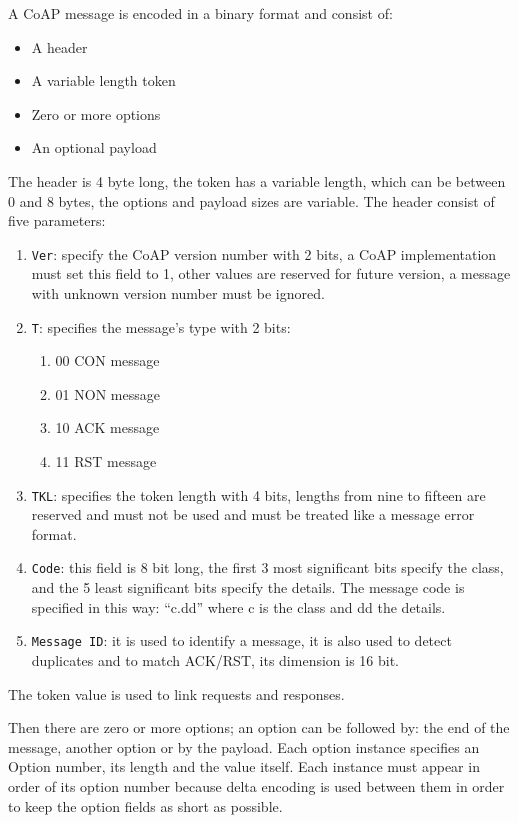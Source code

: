 	A CoAP message is encoded in a binary format and consist of:\newline
	\begin{itemize}
		\item A header
		\item A variable length token
		\item Zero or more options
		\item An optional payload
	\end{itemize}
	The header is 4 byte long, the token has a variable length, which can be between 0 and 8 bytes, the options and payload sizes are variable.\newline
	The header consist of five parameters:\newline
	\begin{enumerate}
		\item \texttt{Ver}: specify the CoAP version number with 2 bits, a CoAP implementation must set this field to 1, other values are reserved for future version, a message with unknown version number must be ignored.
		\item \texttt{T}: specifies the message's type with 2 bits:
		\begin{enumerate}
			\item 00 CON message
			\item 01 NON message
			\item 10 ACK message
			\item 11 RST message
		\end{enumerate}
		\item \texttt{TKL}: specifies the token length with 4 bits, lengths from nine to fifteen are reserved and must not be used and must be treated like a message error format.
		\item \texttt{Code}: this field is 8 bit long, the first 3 most significant bits specify the class, and the 5 least significant bits specify the details.
		The message code is specified in this way: “c.dd” where c is the class and dd the details.
		\item \texttt{Message ID}: it is used to identify a message, it is also used to detect duplicates and to match ACK/RST, its dimension is 16 bit.
	\end{enumerate}
	
	The token value is used to link requests and responses.\newline

	Then there are zero or more options; an option can be followed by: the end of the message, another option or by the payload.\newline
	Each option instance specifies an Option number, its length and the value itself.\newline
	Each instance must appear in order of its option number because delta encoding is used between them in order to keep the option fields as short as possible.\newline
	
